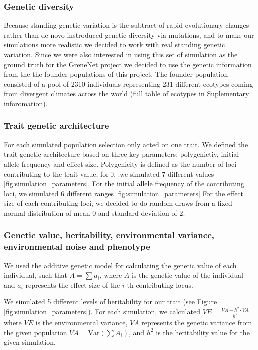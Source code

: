 \documentclass{article}
\begin{document}
\subsubsection{Genetic diversity}
Because standing genetic variation is the subtract of rapid evolutionary changes rather than de novo instroduced genetic diversity via mutations, and to make our simulations more realistic we decided to work with real standing genetic variation. Since we were also interested in using this set of simulation as the ground truth for the GreneNet project we decided to use the genetic information from the the founder populations of this project. The founder population consisted of a pool of 2310 individuals representing 231 different ecotypes coming from divergent climates across the world (full table of ecotypes in Suplementary inforomation).

\subsubsection{Trait genetic architecture}
For each simulated population selection only acted on one trait. We defined the trait genetic architecture based on three key parameters: polygenictiy, initial allele frequency and effect size. Polygenicity is defined as the number of loci contributing to the trait value, for it .we simulated 7 different values \ref{fig:simulation_parameters}. For the initial allele frequency of the contributing loci, we simulated 6 different ranges \ref{fig:simulation_parameters} For the effect size of each contributing loci, we decided to do random draws from a fixed normal distribution of mean 0 and standard deviation of 2. 

\subsubsection{Genetic value, heritability, environmental variance, environmental noise and phenotype}

We used the additive genetic model for calculating the genetic value of each individual, such that \( A = \sum a_i \), where \( A \) is the genetic value of the individual and \( a_i \) represents the effect size of the \( i \)-th contributing locus. 

We simulated 5 different levels of heritability for our trait (see Figure \ref{fig:simulation_parameters}). For each simulation, we calculated $VE = \frac{VA - h^2 \cdot VA}{h^2}$ where \( VE \) is the environmental variance, \( VA \) represents the genetic variance from the given population \( VA = \text{Var}\left(\sum A_i\right) \), and \( h^2 \) is the heritability value for the given simulation. 
\end{document}
